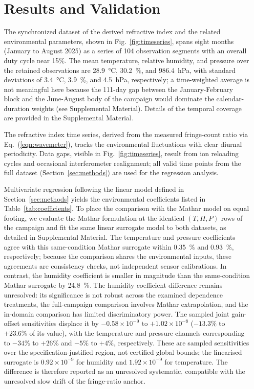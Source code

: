\documentclass[aps,prapplied,reprint,groupedaddress,twocolumn,superscriptaddress,linenumbers]{revtex4-2}
\begin{document}
\section{Results and Validation}
\label{sec:results}

The synchronized dataset of the derived refractive index and the related environmental parameters, shown in Fig.~\ref{fig:timeseries}, spans eight months (January to August 2025) as a series of 104 observation segments with an overall duty cycle near 15\%. The mean temperature, relative humidity, and pressure over the retained observations are \SI{28.9}{\degreeCelsius}, \SI{30.2}{\percent}, and \SI{986.4}{\hecto\pascal}, with standard deviations of \SI{3.4}{\degreeCelsius}, \SI{3.9}{\percent}, and \SI{4.5}{\hecto\pascal}, respectively; a time-weighted average is not meaningful here because the 111-day gap between the January-February block and the June-August body of the campaign would dominate the calendar-duration weights (see Supplemental Material). Details of the temporal coverage are provided in the Supplemental Material.

The refractive index time series, derived from the measured fringe-count ratio via Eq.~(\ref{eqn:wavemeter}), tracks the environmental fluctuations with clear diurnal periodicity. Data gaps, visible in Fig.~\ref{fig:timeseries}, result from ion reloading cycles and occasional interferometer realignment; all valid time points from the full dataset (Section~\ref{sec:methods}) are used for the regression analysis.

Multivariate regression following the linear model defined in Section~\ref{sec:methods} yields the environmental coefficients listed in Table~\ref{tab:coefficients}. To place the comparison with the Mathar model on equal footing, we evaluate the Mathar formulation at the identical $(T,H,P)$ rows of the campaign and fit the same linear surrogate model to both datasets, as detailed in Supplemental Material. The temperature and pressure coefficients agree with this same-condition Mathar surrogate within \SI{0.35}{\percent} and \SI{0.93}{\percent}, respectively; because the comparison shares the environmental inputs, these agreements are consistency checks, not independent sensor calibrations. In contrast, the humidity coefficient is smaller in magnitude than the same-condition Mathar surrogate by \SI{24.8}{\percent}. The humidity coefficient difference remains unresolved: its significance is not robust across the examined dependence treatments, the full-campaign comparison involves Mathar extrapolation, and the in-domain comparison has limited discriminatory power. The sampled joint gain-offset sensitivities displace it by $-0.58\times10^{-9}$ to $+1.02\times10^{-9}$ ($-13.3\%$ to $+23.6\%$ of its value), with the temperature and pressure channels corresponding to $-34\%$ to $+26\%$ and $-5\%$ to $+4\%$, respectively. These are sampled sensitivities over the specification-justified region, not certified global bounds; the linearised surrogate is $0.92\times10^{-9}$ for humidity and $1.92\times10^{-9}$ for temperature. The difference is therefore reported as an unresolved systematic, compatible with the unresolved slow drift of the fringe-ratio anchor.
\end{document}
